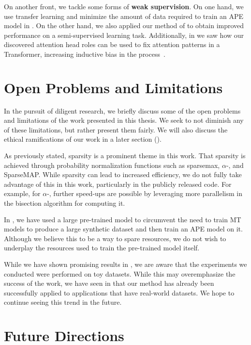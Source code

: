 On another front, we tackle some forms of \textbf{weak supervision}.
On one hand, we use transfer learning and minimize the amount of data
required to train an APE model in . On the other
hand, we also applied our method of  to
obtain improved performance on a semi-supervised learning task.
Additionally, in  we saw how our
discovered attention head roles can be used to fix attention patterns
in a Transformer, increasing inductive bias in the
process~\citep{raganato2020FixedEncoderSelfAttentiona}.

\section{Open Problems and Limitations}

In the pursuit of diligent research, we briefly discuss some of the
open problems and limitations of the work presented in this thesis.
We seek to not diminish any of these limitations, but rather present
them fairly. We will also discuss the ethical ramifications of our
work in a later section ().

As previously stated, sparsity is a prominent theme in this work.
That sparsity is achieved through probability normalization functions
such as sparsemax, $\alpha$-\entmaxtext, and SparseMAP. While
sparsity can lead to increased efficiency, we do not fully take
advantage of this in this work, particularly in the publicly released
code. For example, for $\alpha$-\entmaxtext, further speed-ups are
possible by leveraging more parallelism in the bisection algorithm
for computing it.

In , we have used a large pre-trained model to
circumvent the need to train MT models to produce a large synthetic
dataset and then train an APE model on it. Although we believe
this to be a way to spare resources, we do not wish to underplay
the resources used to train the pre-trained model itself.

While we have shown promising results in ,
we are aware that the experiments we conducted were performed on toy
datasets. While this may overemphasize the success of the work, we
have seen in  that our method has already been
successfully applied to applications that have real-world datasets.
We hope to continue seeing this trend in the future.

\section{Future Directions}

